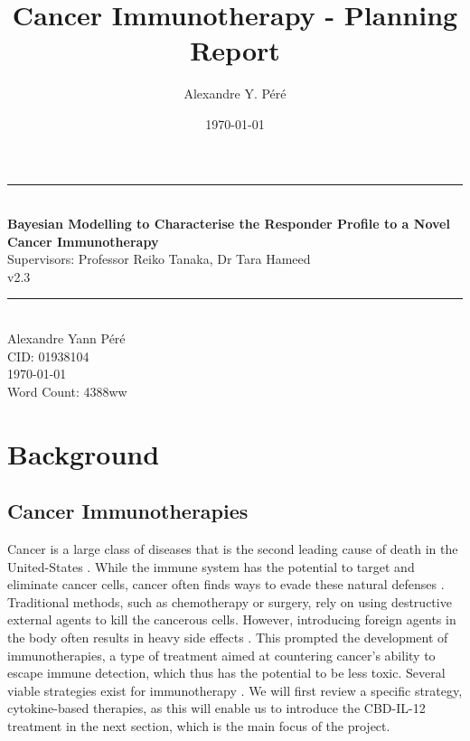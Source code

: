 \documentclass[11pt]{article}
\title{Cancer Immunotherapy - Planning Report}
\author{Alexandre Y. Péré }
\date{\today}
\begin{document}
\begin{titlepage}
    \newcommand{\HRule}{\rule{\linewidth}{0.5mm}}
    \begin{center}
        \HRule \\[0.4cm]
    { \LARGE \bfseries Bayesian Modelling to Characterise the Responder Profile to a  Novel Cancer Immunotherapy\\[0.55cm] }
    { \large Supervisors: Professor Reiko Tanaka, Dr Tara Hameed} \\
    v2.3
    \\[0.4cm]
    \HRule \\[0.5cm]
    { \large Alexandre Yann Péré \\[0.1cm]
    CID: 01938104  \\[0.1cm]
    \today \\ [0.1cm]
    \vspace{10pt}
    Word Count: 4388ww}
    \end{center}
\end{titlepage}

\tableofcontents


%

\pagebreak 
\section{Background}\label{sec:specs}

\subsection{Cancer Immunotherapies}
Cancer is a large class of diseases that is the second leading cause of death in the United-States \cite{nchs}. While the immune system has the potential to target and eliminate cancer cells, cancer often finds ways to evade these natural defenses \cite{EvasionMech}. Traditional methods, such as chemotherapy or surgery, rely on using destructive external agents to kill the cancerous cells. However, introducing foreign agents in the body often results in heavy side effects \cite{oncologyTreatRev}. This prompted the development of immunotherapies, a type of treatment aimed at countering cancer's ability to escape immune detection, which thus has the potential to be less toxic. Several viable strategies exist for immunotherapy \cite{ReviewCPI}. We will first review a specific strategy, cytokine-based therapies, as this will enable us to introduce the CBD-IL-12 treatment in the next section, which is the main focus of the project.
\end{document}
